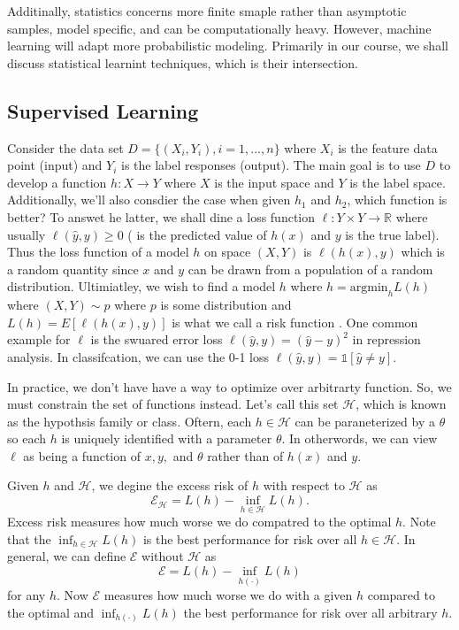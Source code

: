 \documentclass[
]{article}
\begin{document}
Additinally, statistics concerns more finite smaple rather than
asymptotic samples, model specific, and can be computationally heavy.
However, machine learning will adapt more probabilistic modeling.
Primarily in our course, we shall discuss statistical learnint
techniques, which is their intersection.

\hypertarget{supervised-learning}{%
\subsection{Supervised Learning}\label{supervised-learning}}

Consider the data set \(D=\{ (X_i, Y_i), i=1,...,n\}\) where \(X_i\) is
the feature data point (input) and \(Y_i\) is the label responses
(output). The main goal is to use \(D\) to develop a function
\(h: X\to Y\) where \(X\) is the input space and \(Y\) is the label
space. Additionally, we'll also consdier the case when given \(h_1\) and
\(h_2\), which function is better? To answet he latter, we shall dine a
loss function \(\ell : Y \times Y \to \mathbb{R}\) where usually
\(\ell(\hat{y}, y) \geq 0\) ( is the predicted value of \(h(x)\)
and \(y\) is the true label). Thus the loss function of a model \(h\) on
space \((X,Y)\) is \(\ell (h (x),y)\) which is a random quantity since
\(x\) and \(y\) can be drawn from a population of a random distribution.
Ultimiatley, we wish to find a model \(h\) where
\(h=\text{argmin}_h L(h)\) where \((X,Y) \sim p\) where \(p\) is some
distribution and \(L(h)= E[\ell(h(x),y)]\) is what we call a risk
function . One common example for \(\ell\) is the swuared error loss
\(\ell (\hat{y},y) = (\hat{y}-y)^2\) in repression analysis. In
classifcation, we can use the 0-1 loss
\(\ell (\hat{y},y)= \mathbb{1}[\hat{y} \neq y]\).

In practice, we don't have have a way to optimize over arbitrarty
function. So, we must constrain the set of functions instead. Let's call
this set \(\mathcal{H}\), which is known as the hypothsis family or
class. Oftern, each \(h \in \mathcal{H}\) can be paraneterized by a
\(\theta\) so each \(h\) is uniquely identified with a parameter
\(\theta\). In otherwords, we can view \(\ell\) as being a function of
\(x,y,\) and \(\theta\) rather than of \(h(x)\) and \(y\).

Given \(h\) and \(\mathcal{H}\), we degine the excess risk of \(h\) with
respect to \(\mathcal{H}\) as
\[\mathcal{E}_\mathcal{H} = L(h)- \inf_{h \in \mathcal{H}} L(h).\]
Excess risk measures how much worse we do compatred to the optimal
\(h\). Note that the \(\inf_{h \in \mathcal{H}} L(h)\) is the best
performance for risk over all \(h \in \mathcal{H}\). In general, we can
define \(\mathcal{E}\) without \(\mathcal{H}\) as
\[\mathcal{E} = L(h)-\inf_{h(\cdot)}  L(h)\] for any \(h\). Now
\(\mathcal{E}\) measures how much worse we do with a given \(h\)
compared to the optimal and \(\inf_{h(\cdot)} L(h)\) the best
performance for risk over all arbitrary \(h\).
\end{document}
